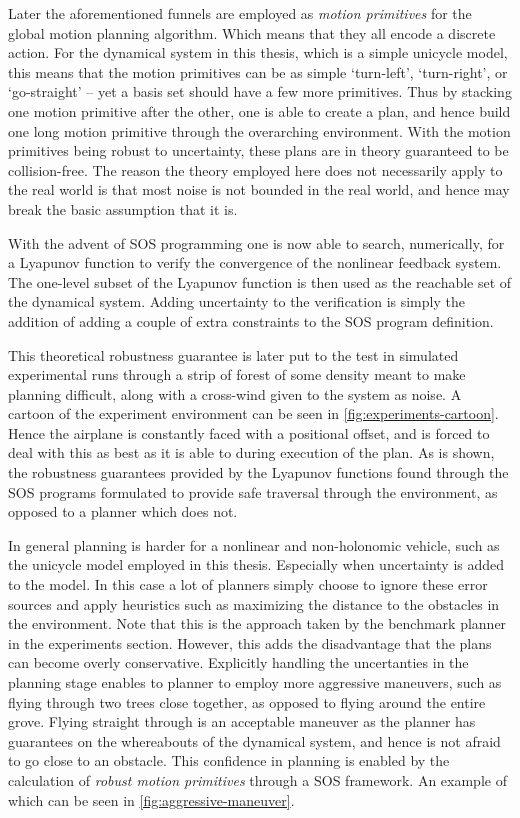 Later the aforementioned funnels are employed as \textit{motion primitives} for
the global motion planning algorithm. Which means that they all encode a
discrete action. For the dynamical system in this thesis, which is a simple
unicycle model, this means that the motion primitives can be as simple
`turn-left', `turn-right', or `go-straight' -- yet a basis set should have a few
more primitives. Thus by stacking one motion primitive after the other, one is
able to create a plan, and hence build one long motion primitive through the
overarching environment. With the motion primitives being robust to uncertainty,
these plans are in theory guaranteed to be collision-free. The reason the theory
employed here does not necessarily apply to the real world is that most noise is
not bounded in the real world, and hence may break the basic assumption that it
is.


With the advent of \ac{SOS} programming one is now able to search, numerically,
for a Lyapunov function to verify the convergence of the nonlinear feedback
system. The one-level subset of the Lyapunov function is then used as the
reachable set of the dynamical system. Adding uncertainty to the verification is
simply the addition of adding a couple of extra constraints to the \ac{SOS}
program definition.


This theoretical robustness guarantee is later put to the test in simulated
experimental runs through a strip of forest of some density meant to make
planning difficult, along with a cross-wind given to the system as noise. A
cartoon of the experiment environment can be seen in
\cref{fig:experiments-cartoon}. Hence the airplane is constantly faced
with a positional offset, and is forced to deal with this as best as it is able
to during execution of the plan. As is shown, the robustness guarantees provided
by the Lyapunov functions found through the \ac{SOS} programs formulated to
provide safe traversal through the environment, as opposed to a planner which
does not.


In general planning is harder for a nonlinear and non-holonomic vehicle, such as
the unicycle model employed in this thesis. Especially when uncertainty is added
to the model. In this case a lot of planners simply choose to ignore these error
sources and apply heuristics such as maximizing the distance to the obstacles in
the environment. Note that this is the approach taken by the benchmark planner
in the experiments section. However, this adds the disadvantage that the plans
can become overly conservative. Explicitly handling the uncertanties in the
planning stage enables to planner to employ more aggressive maneuvers, such as
flying through two trees close together, as opposed to flying around the entire
grove. Flying straight through is an acceptable maneuver as the planner has
guarantees on the whereabouts of the dynamical system, and hence is not afraid
to go close to an obstacle. This confidence in planning is enabled by the
calculation of \textit{robust motion primitives} through a \ac{SOS} framework.
An example of which can be seen in \cref{fig:aggressive-maneuver}.


